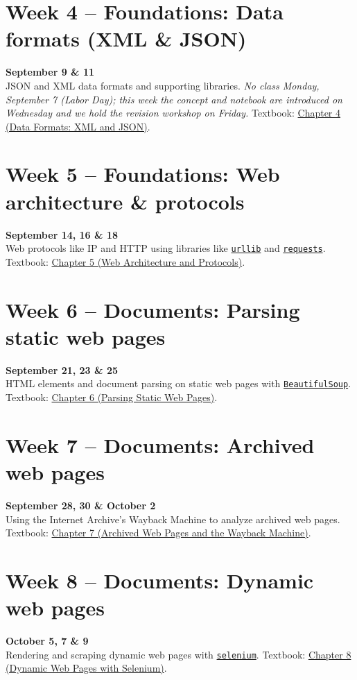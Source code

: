 \documentclass[11pt]{memoir}
\def\bookurl{https://cuinfoscience.github.io/Web-Data-Science-Book/}
\newcommand{\bookch}[2]{\href{\bookurl#1.html}{#2}}
\begin{document}
\section{Week 4 -- Foundations: Data formats (XML \& JSON)}
\textcolor{CUGold}{\textbf{September 9 \& 11}}\\
JSON and XML data formats and supporting libraries. \textit{No class Monday, September 7 (Labor Day); this week the concept and notebook are introduced on Wednesday and we hold the revision workshop on Friday.} Textbook: \bookch{ch-04-data-formats}{Chapter 4 (Data Formats: XML and JSON)}.

\section{Week 5 -- Foundations: Web architecture \& protocols}
\textcolor{CUGold}{\textbf{September 14, 16 \& 18}}\\
Web protocols like IP and HTTP using libraries like \href{https://docs.python.org/3/library/urllib.html}{\texttt{urllib}} and \href{https://requests.readthedocs.io/}{\texttt{requests}}. Textbook: \bookch{ch-05-protocols}{Chapter 5 (Web Architecture and Protocols)}.

\section{Week 6 -- Documents: Parsing static web pages}
\textcolor{CUGold}{\textbf{September 21, 23 \& 25}}\\
HTML elements and document parsing on static web pages with \href{https://www.crummy.com/software/BeautifulSoup/bs4/doc/}{\texttt{BeautifulSoup}}. Textbook: \bookch{ch-06-static-pages}{Chapter 6 (Parsing Static Web Pages)}.

\section{Week 7 -- Documents: Archived web pages}
\textcolor{CUGold}{\textbf{September 28, 30 \& October 2}}\\
Using the Internet Archive's Wayback Machine to analyze archived web pages. Textbook: \bookch{ch-07-archives}{Chapter 7 (Archived Web Pages and the Wayback Machine)}.

\section{Week 8 -- Documents: Dynamic web pages}
\textcolor{CUGold}{\textbf{October 5, 7 \& 9}}\\
Rendering and scraping dynamic web pages with \href{https://selenium-python.readthedocs.io/}{\texttt{selenium}}. Textbook: \bookch{ch-08-dynamic-pages}{Chapter 8 (Dynamic Web Pages with Selenium)}.
\end{document}

